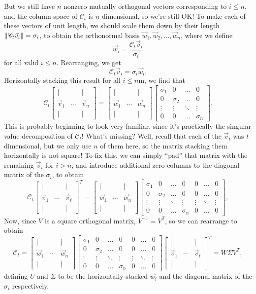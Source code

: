 \documentclass[letterpaper]{article}
\theoremstyle{remark}
\newcommand{\mat}[1]{\ensuremath{\begin{bmatrix}#1\end{bmatrix}}}
\begin{document}
But we still have $n$ nonzero mutually orthogonal vectors corresponding to $i \le n$, and the column space of $\mathscr{C}_t$ is $n$ dimensional, so we're still OK! To make each of these vectors of unit length, we should scale them down by their length $\norm{\mathscr{C}_t\vec{v}_i} = \sigma_i$, to obtain the orthonormal basis $\vec{w}_1, \vec{w}_2, \ldots, \vec{w}_n$, where we define
\[
    \vec{w}_i = \frac{\mathscr{C}_t\vec{v}_i}{\sigma_i}
\]
for all valid $i \le n$. Rearranging, we get
\[
    \mathscr{C}_t\vec{v}_i = \sigma_i\vec{w}_i.
\]
Horizontally stacking this result for all $i \le n$m, we find that
\[
    \mathscr{C}_t \mat{| & & | \\ \vec{v}_1 & \cdots & \vec{v}_n \\ | & & |} = \mat{| & & | \\ \vec{w}_1 & \cdots & \vec{w}_n \\ | & & |} \mat{\sigma_1 & 0 & \ldots &  0 \\ 0 & \sigma_2 & \ldots & 0 \\ \vdots & \vdots & \ddots & \vdots \\ 0 & 0 & \ldots & \sigma_n}.
\]
This is probably beginning to look very familiar, since it's practically the singular value decomposition of $\mathscr{C}_t$! What's missing? Well, recall that each of the $\vec{v}_i$ was $t$ dimensional, but we only use $n$ of them here, so the matrix stacking them horizontally is not square! To fix this, we can simply ``pad'' that matrix with the remaining $\vec{v}_i$ for $i > n$, and introduce additional zero columns to the diagonal matrix of the $\sigma_i$, to obtain
\[
    \mathscr{C}_t \mat{| & & | \\ \vec{v}_1 & \cdots & \vec{v}_t \\ | & & |}^T = \mat{| & & | \\ \vec{w}_1 & \cdots & \vec{w}_n \\ | & & |} \mat{\sigma_1 & 0 & \ldots & 0 & 0 & \ldots & 0 \\ 0 & \sigma_2 & \ldots & 0 & 0 & \ldots & 0 \\ \vdots & \vdots & \ddots & \vdots & \vdots & \ddots & \vdots \\ 0 & 0 & \ldots & \sigma_n & 0 & \ldots & 0},
\]
Now, since $V$ is a square orthogonal matrix, $V^{-1} = V^T$, so we can rearrange to obtain
\[
    \mathscr{C}_t = \mat{| & & | \\ \vec{w}_1 & \cdots & \vec{w}_n \\ | & & |} \mat{\sigma_1 & 0 & \ldots & 0 & 0 & \ldots & 0 \\ 0 & \sigma_2 & \ldots & 0 & 0 & \ldots & 0 \\ \vdots & \vdots & \ddots & \vdots & \vdots & \ddots & \vdots \\ 0 & 0 & \ldots & \sigma_n & 0 & \ldots & 0}\mat{| & & | \\ \vec{v}_1 & \cdots & \vec{v}_t \\ | & & |}^T = W\Sigma V^T,
\]
defining $U$ and $\Sigma$ to be the horizontally stacked $\vec{w}_i$ and the diagonal matrix of the $\sigma_i$ respectively.
\end{document}
